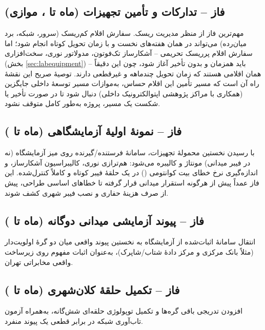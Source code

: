 \subsection*{فاز \texorpdfstring{}{۲} -- تدارکات و تأمین تجهیزات (ماه \texorpdfstring{}{۲} تا \texorpdfstring{}{۸}، موازی)}
مهم‌ترین فاز از منظر مدیریت ریسک. سفارش اقلام کم‌ریسک (سرور، شبکه، برد  میان‌رده) می‌تواند در همان هفته‌های نخست و با زمان تحویل کوتاه انجام شود؛ اما سفارش اقلام پرریسک تحریمی -- آشکارساز تک‌فوتون، مدولاتور نوری،  سخت‌افزاری (بخش \ref{sec:labequipment}) -- باید همزمان و بدون تأخیر آغاز شود، چون این دقیقاً همان اقلامی هستند که زمان تحویل چندماهه و غیرقطعی دارند. توصیهٔ صریح این نقشهٔ راه آن است که مسیر تأمین این اقلام حساس، به‌موازات مسیر توسعهٔ داخلی جایگزین (همکاری با مراکز پژوهشی اپتوالکترونیک داخلی) دنبال شود تا در صورت تأخیر یا شکست یک مسیر، پروژه به‌طور کامل متوقف نشود.

\subsection*{فاز \texorpdfstring{}{۳} -- نمونهٔ اولیهٔ آزمایشگاهی \texorpdfstring{}{QKD} (ماه \texorpdfstring{}{۴} تا \texorpdfstring{}{۸})}
با رسیدن نخستین محمولهٔ تجهیزات، سامانهٔ فرستنده/گیرنده روی میز آزمایشگاه (نه در فیبر میدانی) مونتاژ و کالیبره می‌شود: هم‌ترازی نوری، کالیبراسیون آشکارساز، و اندازه‌گیری نرخ خطای بیت کوانتومی () در یک حلقهٔ فیبر کوتاه و کاملاً کنترل‌شده. این فاز عمداً پیش از هرگونه استقرار میدانی قرار گرفته تا خطاهای اساسی طراحی، پیش از صرف هزینهٔ حفاری و نصب فیبر شهری کشف شوند.

\subsection*{فاز \texorpdfstring{}{۴} -- پیوند آزمایشی میدانی دوگانه (ماه \texorpdfstring{}{۷} تا \texorpdfstring{}{۱۰})}
انتقال سامانهٔ اثبات‌شده از آزمایشگاه به نخستین پیوند واقعی میان دو گرهٔ اولویت‌دار (مثلاً بانک مرکزی و مرکز دادهٔ شتاب/شاپرک)، به‌عنوان اثبات مفهوم روی زیرساخت واقعی مخابراتی تهران.

\subsection*{فاز \texorpdfstring{}{۵} -- تکمیل حلقهٔ کلان‌شهری (ماه \texorpdfstring{}{۹} تا \texorpdfstring{}{۱۳})}
افزودن تدریجی باقی گره‌ها و تکمیل توپولوژی حلقه‌ای شش‌گانه، به‌همراه آزمون تاب‌آوری شبکه در برابر قطعی یک پیوند منفرد.


